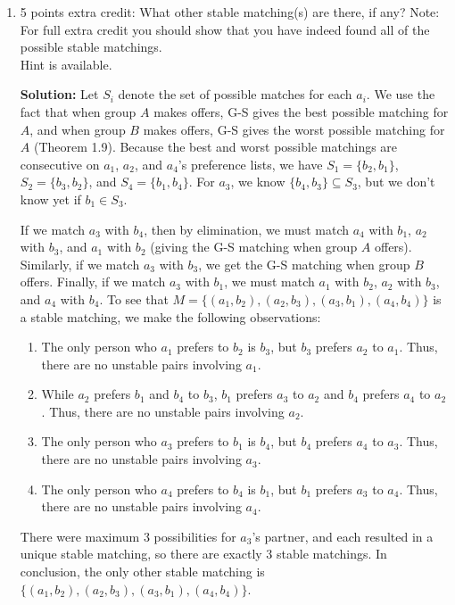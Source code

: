 \documentclass[12pt]{article}
\begin{document}
\begin{enumerate}
\begin{enumerate}
Final matching: $(a_1,b_1)$, $(a_3,b_3)$, $(a_4,b_4)$, $(a_2,b_2)$
\end{enumerate}
$b_1$, $b_2$, $b_3$, and $b_4$ are happier in the new stable matching as they are each matched with someone higher on their preference list.

\item[(c)] 5 points extra credit: What other stable matching(s) are there, if any? Note: For full extra credit you should show that you have indeed found all of the possible stable matchings. \\
Hint is available.

\textbf{Solution:} Let $S_i$ denote the set of possible matches for each $a_i$. We use the fact that when group $A$ makes offers, G-S gives the best possible matching for $A$, and when group $B$ makes offers, G-S gives the worst possible matching for $A$ (Theorem 1.9). Because the best and worst possible matchings are consecutive on $a_1$, $a_2$, and $a_4$'s preference lists, we have $S_1=\{b_2,b_1\}$, $S_2=\{b_3,b_2\}$, and $S_4=\{b_1,b_4\}$. For $a_3$, we know $\{b_4,b_3\}\subseteq S_3$, but we don't know yet if $b_1\in S_3$.

If we match $a_3$ with $b_4$, then by elimination, we must match $a_4$ with $b_1$, $a_2$ with $b_3$, and $a_1$ with $b_2$ (giving the G-S matching when group $A$ offers). Similarly, if we match $a_3$ with $b_3$, we get the G-S matching when group $B$ offers. Finally, if we match $a_3$ with $b_1$, we must match $a_1$ with $b_2$, $a_2$ with $b_3$, and $a_4$ with $b_4$. To see that $M=\{(a_1,b_2),(a_2,b_3),(a_3,b_1),(a_4,b_4)\}$ is a stable matching, we make the following observations:
\begin{enumerate}
\item The only person who $a_1$ prefers to $b_2$ is $b_3$, but $b_3$ prefers $a_2$ to $a_1$. Thus, there are no unstable pairs involving $a_1$.
\item While $a_2$ prefers $b_1$ and $b_4$ to $b_3$, $b_1$ prefers $a_3$ to $a_2$ and $b_4$ prefers $a_4$ to $a_2$. Thus, there are no unstable pairs involving $a_2$.
\item The only person who $a_3$ prefers to $b_1$ is $b_4$, but $b_4$ prefers $a_4$ to $a_3$. Thus, there are no unstable pairs involving $a_3$.
\item The only person who $a_4$ prefers to $b_4$ is $b_1$, but $b_1$ prefers $a_3$ to $a_4$. Thus, there are no unstable pairs involving $a_4$.
\end{enumerate}
There were maximum 3 possibilities for $a_3$'s partner, and each resulted in a unique stable matching, so there are exactly 3 stable matchings. In conclusion, the only other stable matching is $\{(a_1,b_2),(a_2,b_3),(a_3,b_1),(a_4,b_4)\}$.
\end{enumerate}
\end{document}
